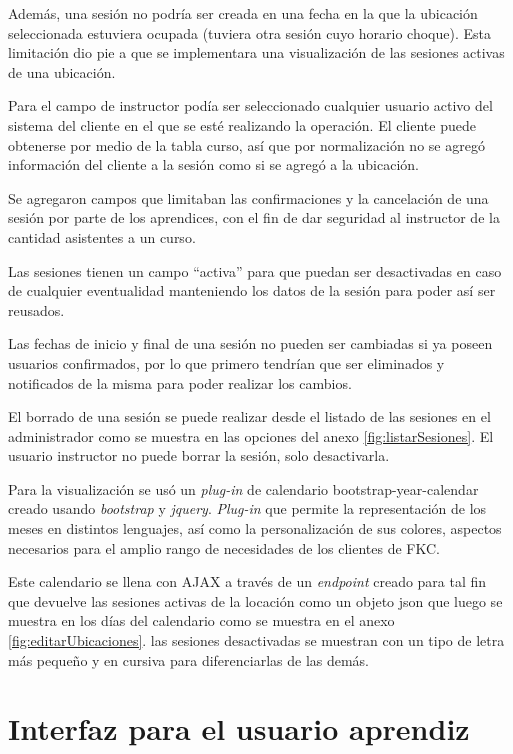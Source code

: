 	Además, una sesión no podría ser creada en una fecha en la que la ubicación seleccionada estuviera ocupada (tuviera otra sesión cuyo horario choque). Esta limitación dio pie a que se implementara una visualización de las sesiones activas de una ubicación.

	Para el campo de instructor podía ser seleccionado cualquier usuario activo del sistema del cliente en el que se esté realizando la operación. El cliente puede obtenerse por medio de la tabla curso, así que por normalización no se agregó información del cliente a la sesión como si se agregó a la ubicación.

	Se agregaron campos que limitaban las confirmaciones y la cancelación de una sesión por parte de los aprendices, con el fin de dar seguridad al instructor de la cantidad asistentes a un curso.

	Las sesiones tienen un campo ``activa'' para que puedan ser desactivadas en caso de cualquier eventualidad manteniendo los datos de la sesión para poder así ser reusados.

	Las fechas de inicio y final de una sesión no pueden ser cambiadas si ya poseen usuarios confirmados, por lo que primero tendrían que ser eliminados y notificados de la misma para poder realizar los cambios.

	El borrado de una sesión se puede realizar desde el listado de las sesiones en el administrador como se muestra en las opciones del anexo \ref{fig:listarSesiones}. El usuario instructor no puede borrar la sesión, solo desactivarla.

	Para la visualización se usó un \emph{plug-in} de calendario bootstrap-year-calendar creado usando \emph{bootstrap} y \emph{jquery}. \emph{Plug-in} que permite la representación de los meses en distintos lenguajes, así como la personalización de sus colores, aspectos necesarios para el amplio rango de necesidades de los clientes de FKC.

	Este calendario se llena con AJAX a través de un \emph{endpoint} creado para tal fin que devuelve las sesiones activas de la locación como un objeto json que luego se muestra en los días del calendario como se muestra en el anexo \ref{fig:editarUbicaciones}. las sesiones desactivadas se muestran con un tipo de letra más pequeño y en cursiva para diferenciarlas de las demás.

	\section{Interfaz para el usuario aprendiz} %
	\label{sec:interfaz_para_el_usuario_aprendiz}
	
